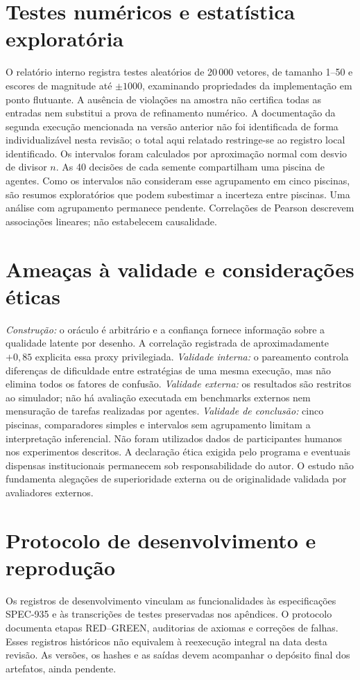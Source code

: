 \documentclass[12pt,openany,oneside,a4paper,brazil,chapter=TITLE]{abntex2}
\begin{document}
\section{Testes numéricos e estatística exploratória}
O relatório interno registra testes aleatórios de 20\,000 vetores, de tamanho 1--50 e escores de magnitude até $\pm1000$, examinando propriedades da implementação em ponto flutuante. A ausência de violações na amostra não certifica todas as entradas nem substitui a prova de refinamento numérico. A documentação da segunda execução mencionada na versão anterior não foi identificada de forma individualizável nesta revisão; o total aqui relatado restringe-se ao registro local identificado.
Os intervalos foram calculados por aproximação normal com desvio de divisor $n$. As 40 decisões de cada semente compartilham uma piscina de agentes. Como os intervalos não consideram esse agrupamento em cinco piscinas, são resumos exploratórios que podem subestimar a incerteza entre piscinas. Uma análise com agrupamento permanece pendente. Correlações de Pearson descrevem associações lineares; não estabelecem causalidade.
\section{Ameaças à validade e considerações éticas}
\textit{Construção:} o oráculo é arbitrário e a confiança fornece informação sobre a qualidade latente por desenho. A correlação registrada de aproximadamente $+0{,}85$ explicita essa proxy privilegiada. \textit{Validade interna:} o pareamento controla diferenças de dificuldade entre estratégias de uma mesma execução, mas não elimina todos os fatores de confusão. \textit{Validade externa:} os resultados são restritos ao simulador; não há avaliação executada em benchmarks externos nem mensuração de tarefas realizadas por agentes. \textit{Validade de conclusão:} cinco piscinas, comparadores simples e intervalos sem agrupamento limitam a interpretação inferencial.
Não foram utilizados dados de participantes humanos nos experimentos descritos. A declaração ética exigida pelo programa e eventuais dispensas institucionais permanecem sob responsabilidade do autor. O estudo não fundamenta alegações de superioridade externa ou de originalidade validada por avaliadores externos.
\section{Protocolo de desenvolvimento e reprodução}
Os registros de desenvolvimento vinculam as funcionalidades às especificações SPEC-935 e às transcrições de testes preservadas nos apêndices. O protocolo documenta etapas RED--GREEN, auditorias de axiomas e correções de falhas. Esses registros históricos não equivalem à reexecução integral na data desta revisão. As versões, os hashes e as saídas devem acompanhar o depósito final dos artefatos, ainda pendente.
\end{document}
